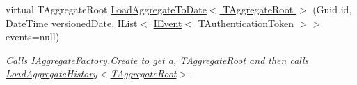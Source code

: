 \begin{DoxyCompactItemize}
virtual T\+Aggregate\+Root \hyperlink{classCqrs_1_1Domain_1_1AggregateRepository_ac53abaf866dc9a9bc5f7b50135c1aa92_ac53abaf866dc9a9bc5f7b50135c1aa92}{Load\+Aggregate\+To\+Date$<$ T\+Aggregate\+Root $>$} (Guid id, Date\+Time versioned\+Date, I\+List$<$ \hyperlink{interfaceCqrs_1_1Events_1_1IEvent}{I\+Event}$<$ T\+Authentication\+Token $>$$>$ events=null)
\begin{DoxyCompactList}\small\item\em Calls I\+Aggregate\+Factory.\+Create to get a, {\itshape T\+Aggregate\+Root}  and then calls \hyperlink{classCqrs_1_1Domain_1_1AggregateRepository_af26efcb464ac989962a9ad138466e4d7_af26efcb464ac989962a9ad138466e4d7}{Load\+Aggregate\+History$<$\+T\+Aggregate\+Root$>$}. \end{DoxyCompactList}\end{DoxyCompactItemize}
